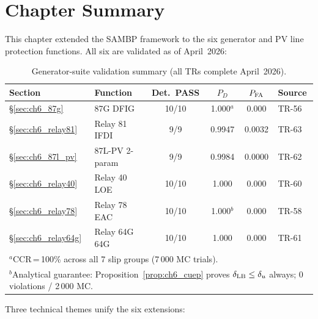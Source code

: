 \section{Chapter Summary}
\label{sec:ch6_summary}

This chapter extended the SAMBP framework to the six generator and PV line
protection functions.  All six are validated as of April~2026:

\begin{table}[h]
  \centering
  \caption{Generator-suite validation summary (all TRs complete April~2026).}
  \label{tab:ch6_summary}
  \small
  \begin{tabular}{llcccl}
    \toprule
    Section & Function & Det.\ PASS & $P_D$ & $P_{\rm FA}$ & Source \\
    \midrule
    \S\ref{sec:ch6_87g}     & 87G DFIG       & 10/10 & 1.000$^a$         & 0.000 & TR-56 \\
    \S\ref{sec:ch6_relay81} & Relay 81 IFDI  &  9/9  & 0.9947            & 0.0032 & TR-63 \\
    \S\ref{sec:ch6_87l_pv}  & 87L-PV 2-param &  9/9  & 0.9984            & 0.0000 & TR-62 \\
    \S\ref{sec:ch6_relay40} & Relay 40 LOE   & 10/10 & 1.000             & 0.000 & TR-60 \\
    \S\ref{sec:ch6_relay78} & Relay 78 EAC   & 10/10 & 1.000$^b$         & 0.000 & TR-58 \\
    \S\ref{sec:ch6_relay64g}& Relay 64G 64G  & 10/10 & 1.000             & 0.000 & TR-61 \\
    \bottomrule
    \multicolumn{6}{l}{\scriptsize $^a$CCR\,=\,100\% across all 7 slip groups (7\,000 MC trials).}\\
    \multicolumn{6}{l}{\scriptsize $^b$Analytical guarantee: Proposition~\ref{prop:ch6_cuep} proves $\delta_{\rm LB} \leq \delta_u$
    always; 0 violations / 2\,000 MC.}\\
  \end{tabular}
\end{table}

Three technical themes unify the six extensions:

